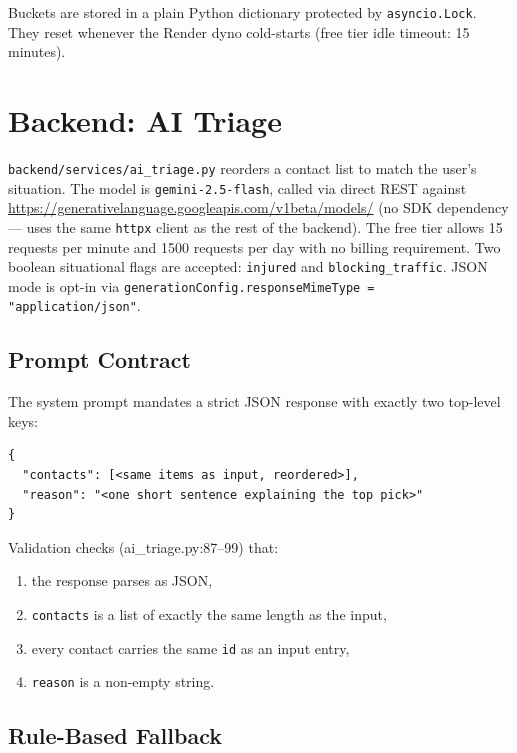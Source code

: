 \documentclass[11pt, a4paper]{article}
\newcommand{\file}[1]{\texttt{\small\color{rsblue}#1}}
\newcommand{\code}[1]{\texttt{\small#1}}
\begin{document}
Buckets are stored in a plain Python dictionary protected by \code{asyncio.Lock}. They reset whenever the Render dyno cold-starts (free tier idle timeout: 15 minutes).

\section{Backend: AI Triage}

\file{backend/services/ai\_triage.py} reorders a contact list to match the user's situation. The model is \texttt{gemini-2.5-flash}, called via direct REST against \url{https://generativelanguage.googleapis.com/v1beta/models/} (no SDK dependency --- uses the same \code{httpx} client as the rest of the backend). The free tier allows 15 requests per minute and 1500 requests per day with no billing requirement. Two boolean situational flags are accepted: \code{injured} and \code{blocking\_traffic}. JSON mode is opt-in via \code{generationConfig.responseMimeType = "application/json"}.

\subsection{Prompt Contract}

The system prompt mandates a strict JSON response with exactly two top-level keys:

\begin{lstlisting}[language={},caption={Required model output schema}]
{
  "contacts": [<same items as input, reordered>],
  "reason": "<one short sentence explaining the top pick>"
}
\end{lstlisting}

Validation checks (ai\_triage.py:87--99) that:

\begin{enumerate}[leftmargin=*, itemsep=2pt, topsep=2pt]
  \item the response parses as JSON,
  \item \code{contacts} is a list of exactly the same length as the input,
  \item every contact carries the same \code{id} as an input entry,
  \item \code{reason} is a non-empty string.
\end{enumerate}

\subsection{Rule-Based Fallback}
\end{document}
